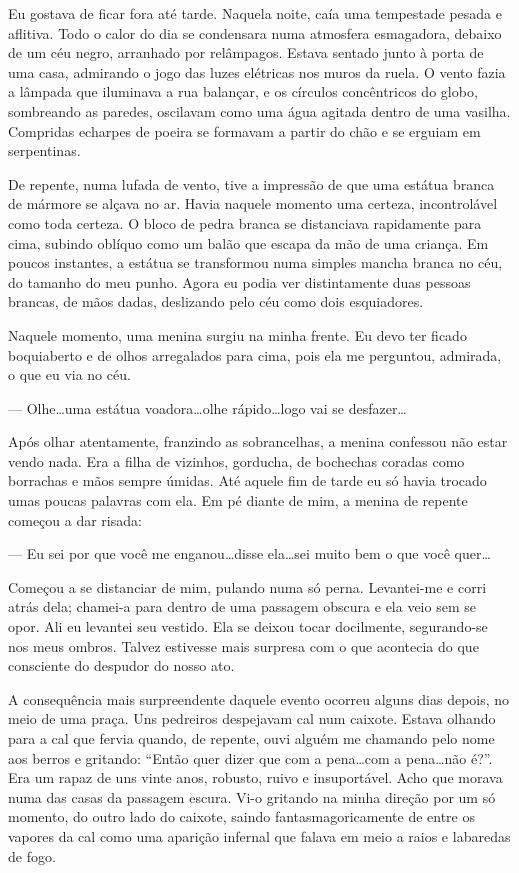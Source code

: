 Eu gostava de ficar fora até tarde. Naquela noite, caía uma tempestade pesada e aflitiva. Todo o calor do dia se condensara numa atmosfera esmagadora, debaixo de um céu negro, arranhado por relâmpagos. Estava sentado junto à porta de uma casa, admirando o jogo das luzes elétricas nos muros da ruela. O vento fazia a lâmpada que iluminava a rua balançar, e os círculos concêntricos do globo, sombreando as paredes, oscilavam como uma água agitada dentro de uma vasilha. Compridas echarpes de poeira se formavam a partir do chão e se erguiam em serpentinas.

De repente, numa lufada de vento, tive a impressão de que uma estátua branca de mármore se alçava no ar. Havia naquele momento uma certeza, incontrolável como toda certeza. O bloco de pedra branca se distanciava rapidamente para cima, subindo oblíquo como um balão que escapa da mão de uma criança. Em poucos instantes, a estátua se transformou numa simples mancha branca no céu, do tamanho do meu punho. Agora eu podia ver distintamente duas pessoas brancas, de mãos dadas, deslizando pelo céu como dois esquiadores.

Naquele momento, uma menina surgiu na minha frente. Eu devo ter ficado boquiaberto e de olhos arregalados para cima, pois ela me perguntou, admirada, o que eu via no céu.

--- Olhe\dots uma estátua voadora\dots olhe rápido\dots logo vai se desfazer\dots

Após olhar atentamente, franzindo as sobrancelhas, a menina confessou não estar vendo nada. Era a filha de vizinhos, gorducha, de bochechas coradas como borrachas e mãos sempre úmidas. Até aquele fim de tarde eu só havia trocado umas poucas palavras com ela. Em pé diante de mim, a menina de repente começou a dar risada:

--- Eu sei por que você me enganou\dots disse ela\dots sei muito bem o que você quer\dots

Começou a se distanciar de mim, pulando numa só perna. Levantei-me e corri atrás dela; chamei-a para dentro de uma passagem obscura e ela veio sem se opor. Ali eu levantei seu vestido. Ela se deixou tocar docilmente, segurando-se nos meus ombros. Talvez estivesse mais surpresa com o que acontecia do que consciente do despudor do nosso ato.

A consequência mais surpreendente daquele evento ocorreu alguns dias depois, no meio de uma praça. Uns pedreiros despejavam cal num caixote. Estava olhando para a cal que fervia quando, de repente, ouvi alguém me chamando pelo nome aos berros e gritando: ``Então quer dizer que com a pena\dots com a pena\dots não é?''. Era um rapaz de uns vinte anos, robusto, ruivo e insuportável. Acho que morava numa das casas da passagem escura. Vi-o gritando na minha direção por um só momento, do outro lado do caixote, saindo fantasmagoricamente de entre os vapores da cal como uma aparição infernal que falava em meio a raios e labaredas de fogo.

